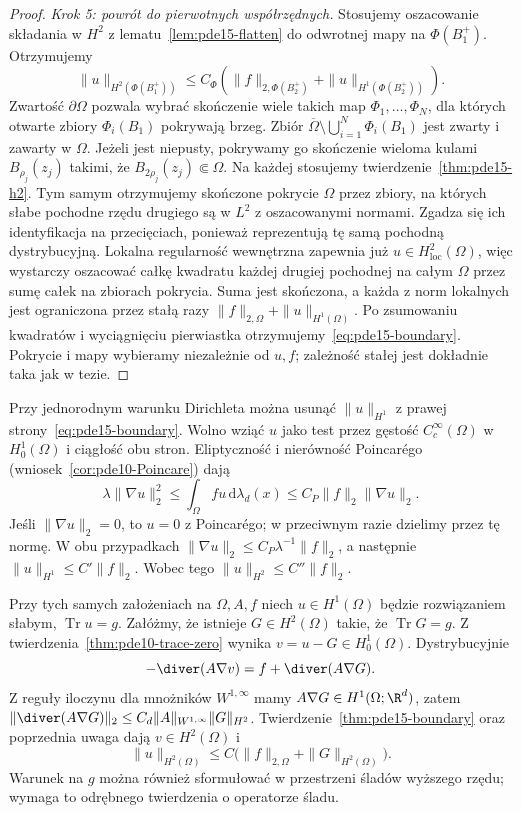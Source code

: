 \begin{proof}
\emph{Krok 5: powrót do pierwotnych współrzędnych.}
Stosujemy oszacowanie składania w $H^2$
z lematu~\ref{lem:pde15-flatten} do odwrotnej mapy
na $\Phi(B_1^+)$. Otrzymujemy
\[
 \|u\|_{H^2(\Phi(B_1^+))}
 \le C_\Phi(\|f\|_{2,\Phi(B_2^+)}
                 +\|u\|_{H^1(\Phi(B_2^+))}).
\]
Zwartość $\partial\Omega$ pozwala wybrać skończenie wiele
takich map $\Phi_1,\ldots,\Phi_N$, dla których otwarte
zbiory $\Phi_i(B_1)$ pokrywają brzeg.
Zbiór $\overline\Omega\setminus\bigcup_{i=1}^N\Phi_i(B_1)$
jest zwarty i zawarty w $\Omega$.
Jeżeli jest niepusty, pokrywamy go skończenie wieloma
kulami $B_{\rho_j}(z_j)$ takimi, że
$B_{2\rho_j}(z_j)\Subset\Omega$.
Na każdej stosujemy twierdzenie~\ref{thm:pde15-h2}.
Tym samym otrzymujemy skończone pokrycie $\Omega$
przez zbiory, na których słabe pochodne rzędu drugiego
są w $L^2$ z oszacowanymi normami.
Zgadza się ich identyfikacja na przecięciach,
ponieważ reprezentują tę samą pochodną dystrybucyjną.
Lokalna regularność wewnętrzna zapewnia już
$u\in H^2_{\mathrm{loc}}(\Omega)$, więc wystarczy
oszacować całkę kwadratu każdej drugiej pochodnej
na całym $\Omega$ przez sumę całek na zbiorach pokrycia.
Suma jest skończona, a każda z norm lokalnych
jest ograniczona przez stałą razy
$\|f\|_{2,\Omega}+\|u\|_{H^1(\Omega)}$.
Po zsumowaniu kwadratów i wyciągnięciu pierwiastka
otrzymujemy~\eqref{eq:pde15-boundary}. Pokrycie i mapy
wybieramy niezależnie od $u,f$; zależność stałej
jest dokładnie taka jak w tezie.
\end{proof}

\begin{uwaga}
Przy jednorodnym warunku Dirichleta można usunąć
$\|u\|_{H^1}$ z prawej strony~\eqref{eq:pde15-boundary}.
Wolno wziąć $u$ jako test przez gęstość
$C_c^\infty(\Omega)$ w $H_0^1(\Omega)$ i ciągłość obu
stron. Eliptyczność i nierówność Poincarégo
(wniosek~\ref{cor:pde10-Poincare}) dają
\[
 \lambda\|\nabla u\|_2^2
 \le\int_\Omega fu\,\mathrm d\lambda_d(x)
 \le C_P\|f\|_2\|\nabla u\|_2.
\]
Jeśli $\|\nabla u\|_2=0$, to $u=0$ z Poincarégo;
w przeciwnym razie dzielimy przez tę normę.
W obu przypadkach $\|\nabla u\|_2\le C_P\lambda^{-1}\|f\|_2$,
a następnie $\|u\|_{H^1}\le C'\|f\|_2$.
Wobec tego $\|u\|_{H^2}\le C''\|f\|_2$.
\end{uwaga}

\begin{uwaga}
Przy tych samych założeniach na $\Omega,A,f$ niech
$u\in H^1(\Omega)$ będzie rozwiązaniem słabym,
$\operatorname{Tr}u=g$. Załóżmy, że istnieje
$G\in H^2(\Omega)$ takie, że $\operatorname{Tr}G=g$.
Z twierdzenia~\ref{thm:pde10-trace-zero} wynika
$v=u-G\in H_0^1(\Omega)$. Dystrybucyjnie
\[
 -\diver(A\nabla v)=f+\diver(A\nabla G).
\]
Z reguły iloczynu dla mnożników $W^{1,\infty}$
mamy $A\nabla G\in H^1(\Omega;\R^d)$, zatem
$\|\diver(A\nabla G)\|_2\le C_d\|A\|_{W^{1,\infty}}
\|G\|_{H^2}$. Twierdzenie~\ref{thm:pde15-boundary}
oraz poprzednia uwaga dają $v\in H^2(\Omega)$ i
\[
 \|u\|_{H^2(\Omega)}
 \le C\bigl(\|f\|_{2,\Omega}+\|G\|_{H^2(\Omega)}\bigr).
\]
Warunek na $g$ można również sformułować w przestrzeni
śladów wyższego rzędu; wymaga to odrębnego twierdzenia
o operatorze śladu.
\end{uwaga}

